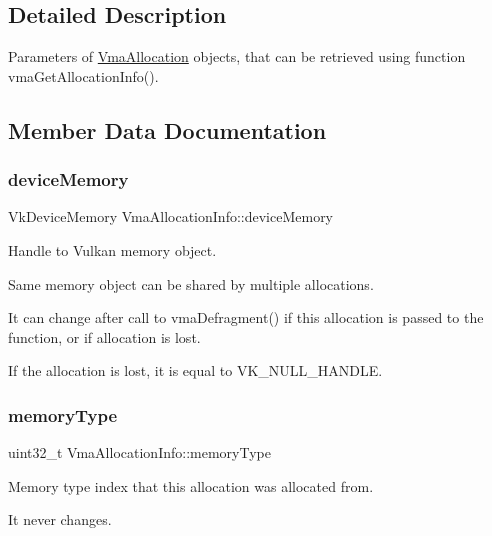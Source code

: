 \subsection{Detailed Description}
Parameters of \hyperlink{structVmaAllocation}{Vma\+Allocation} objects, that can be retrieved using function vma\+Get\+Allocation\+Info(). 

\subsection{Member Data Documentation}
\mbox{\label{structVmaAllocationInfo_ae0bfb7dfdf79a76ffefc9a94677a2f67}} 
\subsubsection{\texorpdfstring{device\+Memory}{deviceMemory}}
{\footnotesize\ttfamily Vk\+Device\+Memory Vma\+Allocation\+Info\+::device\+Memory}



Handle to Vulkan memory object. 

Same memory object can be shared by multiple allocations.

It can change after call to vma\+Defragment() if this allocation is passed to the function, or if allocation is lost.

If the allocation is lost, it is equal to {\ttfamily V\+K\+\_\+\+N\+U\+L\+L\+\_\+\+H\+A\+N\+D\+LE}. \mbox{\label{structVmaAllocationInfo_a7f6b0aa58c135e488e6b40a388dad9d5}} 
\subsubsection{\texorpdfstring{memory\+Type}{memoryType}}
{\footnotesize\ttfamily uint32\+\_\+t Vma\+Allocation\+Info\+::memory\+Type}



Memory type index that this allocation was allocated from. 

It never changes. \mbox{\label{structVmaAllocationInfo_a4a3c732388dbdc7a23f9365b00825268}} 
